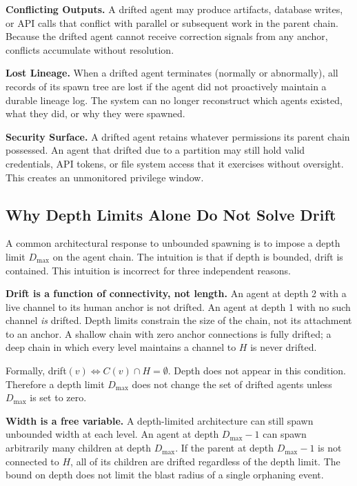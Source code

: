 \medskip
\noindent\textbf{Conflicting Outputs.}
A drifted agent may produce artifacts, database writes, or API calls that
conflict with parallel or subsequent work in the parent chain. Because the
drifted agent cannot receive correction signals from any anchor, conflicts
accumulate without resolution.

\medskip
\noindent\textbf{Lost Lineage.}
When a drifted agent terminates (normally or abnormally), all records of its
spawn tree are lost if the agent did not proactively maintain a durable lineage
log. The system can no longer reconstruct which agents existed, what they did,
or why they were spawned.

\medskip
\noindent\textbf{Security Surface.}
A drifted agent retains whatever permissions its parent chain possessed. An agent
that drifted due to a partition may still hold valid credentials, API tokens,
or file system access that it exercises without oversight. This creates an
unmonitored privilege window.

\subsection{Why Depth Limits Alone Do Not Solve Drift}

A common architectural response to unbounded spawning is to impose a depth limit
$D_{\max}$ on the agent chain. The intuition is that if depth is bounded,
drift is contained. This intuition is incorrect for three independent reasons.

\medskip
\noindent\textbf{Drift is a function of connectivity, not length.}
An agent at depth 2 with a live channel to its human anchor is not drifted.
An agent at depth 1 with no such channel \emph{is} drifted. Depth limits
constrain the size of the chain, not its attachment to an anchor. A shallow
chain with zero anchor connections is fully drifted; a deep chain in which
every level maintains a channel to $H$ is never drifted.

Formally, drift$(v) \iff C(v) \cap H = \emptyset$. Depth does not appear in
this condition. Therefore a depth limit $D_{\max}$ does not change the set of
drifted agents unless $D_{\max}$ is set to zero.

\medskip
\noindent\textbf{Width is a free variable.}
A depth-limited architecture can still spawn unbounded width at each level.
An agent at depth $D_{\max} - 1$ can spawn arbitrarily many children at depth
$D_{\max}$. If the parent at depth $D_{\max} - 1$ is not connected to $H$,
all of its children are drifted regardless of the depth limit. The bound on
depth does not limit the blast radius of a single orphaning event.

